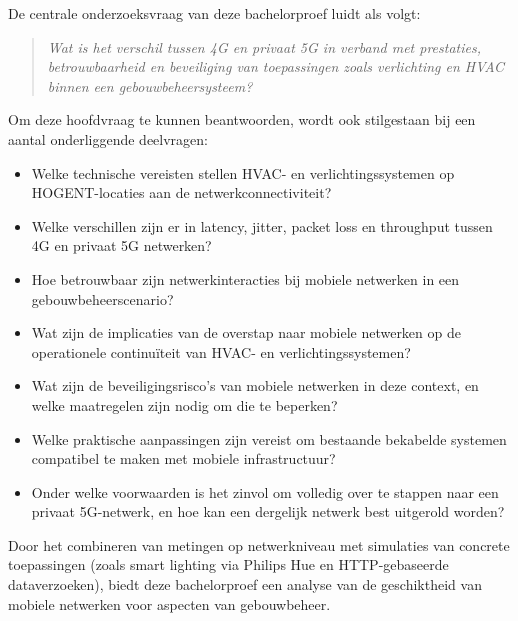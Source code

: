 De centrale onderzoeksvraag van deze bachelorproef luidt als volgt:

\begin{quote}
    \textit{Wat is het verschil tussen 4G en privaat 5G in verband met prestaties, betrouwbaarheid en beveiliging van toepassingen zoals verlichting en HVAC binnen een gebouwbeheersysteem?}
\end{quote}

Om deze hoofdvraag te kunnen beantwoorden, wordt ook stilgestaan bij een aantal onderliggende deelvragen:

\begin{itemize}
    \item Welke technische vereisten stellen HVAC- en verlichtingssystemen op HOGENT-locaties aan de netwerkconnectiviteit?
    \item Welke verschillen zijn er in latency, jitter, packet loss en throughput tussen 4G en privaat 5G netwerken?
    \item Hoe betrouwbaar zijn netwerkinteracties bij mobiele netwerken in een gebouwbeheerscenario?
    \item Wat zijn de implicaties van de overstap naar mobiele netwerken op de operationele continuïteit van HVAC- en verlichtingssystemen?
    \item Wat zijn de beveiligingsrisco’s van mobiele netwerken in deze context, en welke maatregelen zijn nodig om die te beperken?
    \item Welke praktische aanpassingen zijn vereist om bestaande bekabelde systemen compatibel te maken met mobiele infrastructuur?
    \item Onder welke voorwaarden is het zinvol om volledig over te stappen naar een privaat 5G-netwerk, en hoe kan een dergelijk netwerk best uitgerold worden?
\end{itemize}

Door het combineren van metingen op netwerkniveau met simulaties van concrete toepassingen (zoals smart lighting via Philips Hue en HTTP-gebaseerde dataverzoeken), biedt deze bachelorproef een  analyse van de geschiktheid van mobiele netwerken voor aspecten van gebouwbeheer.

